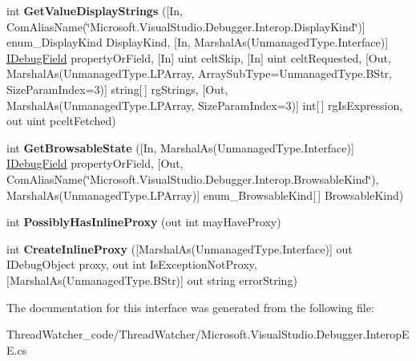 \begin{DoxyCompactItemize}
\item 
\hypertarget{interface_microsoft_1_1_visual_studio_1_1_debugger_1_1_interop_e_e_1_1_i_e_e_visualizer_service_ad3c720f4d1b33ab286e22c6beda8f897}{int {\bfseries Get\+Value\+Display\+Strings} (\mbox{[}In, Com\+Alias\+Name(\char`\"{}Microsoft.\+Visual\+Studio.\+Debugger.\+Interop.\+Display\+Kind\char`\"{})\mbox{]} enum\+\_\+\+Display\+Kind Display\+Kind, \mbox{[}In, Marshal\+As(Unmanaged\+Type.\+Interface)\mbox{]} \hyperlink{interface_microsoft_1_1_visual_studio_1_1_debugger_1_1_interop_e_e_1_1_i_debug_field}{I\+Debug\+Field} property\+Or\+Field, \mbox{[}In\mbox{]} uint celt\+Skip, \mbox{[}In\mbox{]} uint celt\+Requested, \mbox{[}Out, Marshal\+As(Unmanaged\+Type.\+L\+P\+Array, Array\+Sub\+Type=Unmanaged\+Type.\+B\+Str, Size\+Param\+Index=3)\mbox{]} string\mbox{[}$\,$\mbox{]} rg\+Strings, \mbox{[}Out, Marshal\+As(Unmanaged\+Type.\+L\+P\+Array, Size\+Param\+Index=3)\mbox{]} int\mbox{[}$\,$\mbox{]} rg\+Is\+Expression, out uint pcelt\+Fetched)}\label{interface_microsoft_1_1_visual_studio_1_1_debugger_1_1_interop_e_e_1_1_i_e_e_visualizer_service_ad3c720f4d1b33ab286e22c6beda8f897}

\item 
\hypertarget{interface_microsoft_1_1_visual_studio_1_1_debugger_1_1_interop_e_e_1_1_i_e_e_visualizer_service_a7e4ecb7e257379cb559bac310165c6ba}{int {\bfseries Get\+Browsable\+State} (\mbox{[}In, Marshal\+As(Unmanaged\+Type.\+Interface)\mbox{]} \hyperlink{interface_microsoft_1_1_visual_studio_1_1_debugger_1_1_interop_e_e_1_1_i_debug_field}{I\+Debug\+Field} property\+Or\+Field, \mbox{[}Out, Com\+Alias\+Name(\char`\"{}Microsoft.\+Visual\+Studio.\+Debugger.\+Interop.\+Browsable\+Kind\char`\"{}), Marshal\+As(Unmanaged\+Type.\+L\+P\+Array)\mbox{]} enum\+\_\+\+Browsable\+Kind\mbox{[}$\,$\mbox{]} Browsable\+Kind)}\label{interface_microsoft_1_1_visual_studio_1_1_debugger_1_1_interop_e_e_1_1_i_e_e_visualizer_service_a7e4ecb7e257379cb559bac310165c6ba}

\item 
\hypertarget{interface_microsoft_1_1_visual_studio_1_1_debugger_1_1_interop_e_e_1_1_i_e_e_visualizer_service_a25333dd2723e8a7547301dda7614b24d}{int {\bfseries Possibly\+Has\+Inline\+Proxy} (out int may\+Have\+Proxy)}\label{interface_microsoft_1_1_visual_studio_1_1_debugger_1_1_interop_e_e_1_1_i_e_e_visualizer_service_a25333dd2723e8a7547301dda7614b24d}

\item 
\hypertarget{interface_microsoft_1_1_visual_studio_1_1_debugger_1_1_interop_e_e_1_1_i_e_e_visualizer_service_ae27b2595f88d6c0b2146b7eb25ef7a91}{int {\bfseries Create\+Inline\+Proxy} (\mbox{[}Marshal\+As(Unmanaged\+Type.\+Interface)\mbox{]} out I\+Debug\+Object proxy, out int Is\+Exception\+Not\+Proxy, \mbox{[}Marshal\+As(Unmanaged\+Type.\+B\+Str)\mbox{]} out string error\+String)}\label{interface_microsoft_1_1_visual_studio_1_1_debugger_1_1_interop_e_e_1_1_i_e_e_visualizer_service_ae27b2595f88d6c0b2146b7eb25ef7a91}

\end{DoxyCompactItemize}


The documentation for this interface was generated from the following file\+:\begin{DoxyCompactItemize}
\item 
Thread\+Watcher\+\_\+code/\+Thread\+Watcher/Microsoft.\+Visual\+Studio.\+Debugger.\+Interop\+E\+E.\+cs\end{DoxyCompactItemize}
